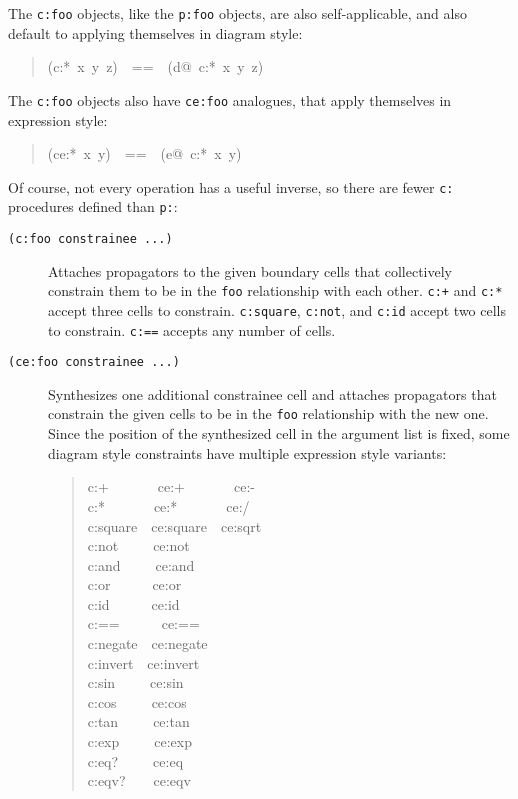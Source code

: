 \documentclass[12pt,letterpaper,english]{article}
\begin{document}
The \texttt{c:foo} objects, like the \texttt{p:foo} objects, are also
self-applicable, and also default to applying themselves
in diagram style:
\begin{quote}{\ttfamily \raggedright \noindent
(c:*~x~y~z)~~==~~(d@~c:*~x~y~z)
}\end{quote}

The \texttt{c:foo} objects also have \texttt{ce:foo} analogues, that
apply themselves in expression style:
\begin{quote}{\ttfamily \raggedright \noindent
(ce:*~x~y)~~==~~(e@~c:*~x~y)
}\end{quote}

Of course, not every operation has a useful inverse, so there are
fewer \texttt{c:} procedures defined than \texttt{p:}:
\begin{description}
\item[{\texttt{(c:foo constrainee ...)}}] \leavevmode 
Attaches propagators to the given boundary cells that collectively
constrain them to be in the \texttt{foo} relationship with each other.
\texttt{c:+} and \texttt{c:*} accept three cells to constrain.  \texttt{c:square},
\texttt{c:not}, and \texttt{c:id} accept two cells to constrain.  \texttt{c:==}
accepts any number of cells.

\item[{\texttt{(ce:foo constrainee ...)}}] \leavevmode 
Synthesizes one additional constrainee cell and attaches propagators
that constrain the given cells to be in the \texttt{foo} relationship
with the new one.  Since the position of the synthesized cell in
the argument list is fixed, some diagram style constraints have
multiple expression style variants:
\begin{quote}{\ttfamily \raggedright \noindent
c:+~~~~~~~ce:+~~~~~~~ce:-~\\
c:*~~~~~~~ce:*~~~~~~~ce:/~\\
c:square~~ce:square~~ce:sqrt~\\
c:not~~~~~ce:not~\\
c:and~~~~~ce:and~\\
c:or~~~~~~ce:or~\\
c:id~~~~~~ce:id~\\
c:==~~~~~~ce:==~\\
c:negate~~ce:negate~\\
c:invert~~ce:invert~\\
c:sin~~~~~ce:sin~\\
c:cos~~~~~ce:cos~\\
c:tan~~~~~ce:tan~\\
c:exp~~~~~ce:exp~\\
c:eq?~~~~~ce:eq~\\
c:eqv?~~~~ce:eqv~
}\end{quote}
\end{description}
\end{document}
